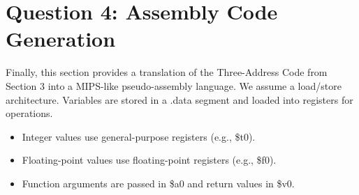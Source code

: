 \documentclass[11pt, letterpaper]{article}
\begin{document}
\section{Question 4: Assembly Code Generation}
Finally, this section provides a translation of the Three-Address Code from Section 3 into a MIPS-like pseudo-assembly language. We assume a load/store architecture. Variables are stored in a .data segment and loaded into registers for operations.
\begin{itemize}
\item Integer values use general-purpose registers (e.g., \$t0).
\item Floating-point values use floating-point registers (e.g., \$f0).
\item Function arguments are passed in \$a0 and return values in \$v0.
\end{itemize}
\end{document}
